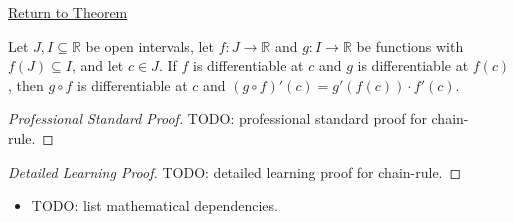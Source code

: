 \newpage
{}
\label{prf:chain-rule}

\begin{remark*}[Return]
\hyperref[thm:chain-rule]{Return to Theorem}
\end{remark*}

\begin{theorem*}
Let $J, I \subseteq \mathbb{R}$ be open intervals, let $f : J \to \mathbb{R}$ and $g : I \to \mathbb{R}$ be functions with $f(J) \subseteq I$, and let $c \in J$. If $f$ is differentiable at $c$ and $g$ is differentiable at $f(c)$, then $g \circ f$ is differentiable at $c$ and $(g \circ f)'(c) = g'(f(c)) \cdot f'(c)$.
\end{theorem*}

\begin{proof}[Professional Standard Proof]
\LRAProofBodyStart
TODO: professional standard proof for chain-rule.
\end{proof}

\begin{proof}[Detailed Learning Proof]
\LRAProofBodyStart
TODO: detailed learning proof for chain-rule.
\end{proof}

\begin{remark*}
\end{remark*}

\begin{dependencies}
\begin{itemize}
  \item TODO: list mathematical dependencies.
\end{itemize}
\end{dependencies}

\clearpage
